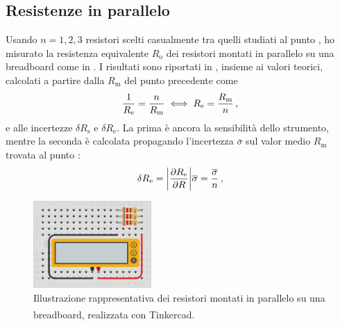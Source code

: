         \subsection{Resistenze in parallelo}
            Usando $n = 1, 2, 3$ resistori scelti casualmente tra quelli studiati al punto , ho misurato la resistenza equivalente $R_\text{o}$ dei resistori montati in parallelo su una breadboard come in . I risultati sono riportati in , insieme ai valori teorici, calcolati a partire dalla $R_\text{m}$ del punto precedente come
            \begin{equation*}
                \frac{1}{R_\text{e}}
                = \frac{n}{R_\text{m}}
                \iff R_\text{e} = \frac{R_\text{m}}{n}
                \,,
            \end{equation*}
            e alle incertezze $\delta R_\text{s}$ e $\delta R_\text{e}$. La prima è ancora la sensibilità dello strumento, mentre la seconda è calcolata propagando l'incertezza $\overline{\sigma}$ sul valor medio $R_\text{m}$ trovata al punto :
            \begin{equation*}
                \delta R_\text{e}
                = \abs{\pdv{R_\text{e}}{R}}\overline{\sigma}
                = \frac{\overline{\sigma}}{n}
                \,,
            \end{equation*}
            \begin{figure}
                \centering
                \includegraphics[width=0.4\textwidth]{images/multimetro/res-parallelo.png}
                \caption{Illustrazione rappresentativa dei resistori montati in parallelo su una breadboard, realizzata con Tinkercad\textsuperscript{\tiny\textregistered}.}
                \label{fig:mul:res-parallelo}
            \end{figure}
            \begin{table}
                \centering
                
                \caption{Resistenze equivalenti misurate su resistori in parallelo e relative incertezze. Tutti i valori sono espressi in \unit{\ohm}.}
                \label{tab:mul:res-parallelo}
            \end{table}

